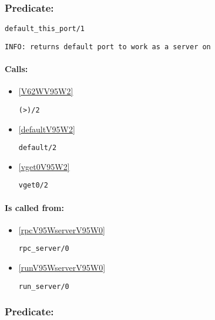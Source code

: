 \subsubsection{Predicate:} \label{defaultV95WthisV95WportV95W1}

\begin{verbatim}
default_this_port/1
\end{verbatim}

{\small \begin{verbatim}
INFO: returns default port to work as a server on

\end{verbatim}}
\paragraph{Calls:} 
\begin{itemize}
\item \ref{V62WV95W2} 
\begin{verbatim}
(>)/2
\end{verbatim}

\item \ref{defaultV95W2} 
\begin{verbatim}
default/2
\end{verbatim}

\item \ref{vget0V95W2} 
\begin{verbatim}
vget0/2
\end{verbatim}

\end{itemize}
\paragraph{Is called from:} 
\begin{itemize}
\item \ref{rpcV95WserverV95W0} 
\begin{verbatim}
rpc_server/0
\end{verbatim}

\item \ref{runV95WserverV95W0} 
\begin{verbatim}
run_server/0
\end{verbatim}

\end{itemize}

\subsubsection{Predicate:} \label{defaultV95WtimeoutV95W1}

